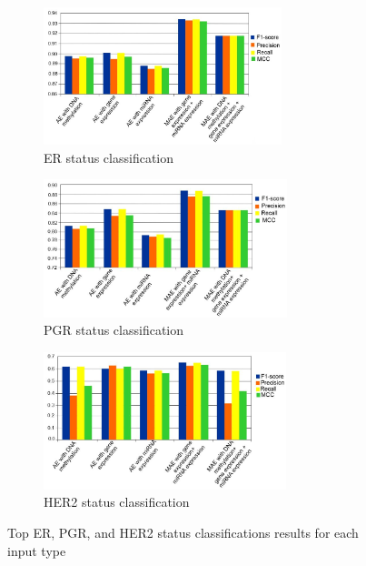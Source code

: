 \begin{figure}
	\centering
	\begin{subfigure}{.49\linewidth}
		\centering
		\includegraphics[width=0.8\linewidth,height=40mm]{images/1.png}
		\caption{ER status classification}
        \label{fig:top_er}
	\end{subfigure}
	\begin{subfigure}{.49\linewidth}
		\centering
		\includegraphics[width=0.8\linewidth,height=40mm]{images/2.png}
		\caption{PGR status classification}
        \label{fig:top_pgr}
	\end{subfigure}
	\begin{subfigure}{0.49\linewidth}
		\centering
		\includegraphics[width=0.8\linewidth,height=40mm]{images/3.png}
		\caption{HER2 status classification }
        \label{fig:top_her2}
	\end{subfigure}
	\caption{Top ER, PGR, and HER2 status classifications results for each input type~\cite{karimACCESS2019}} 
	\label{fig6}
		\vspace{-2mm} 
\end{figure}

